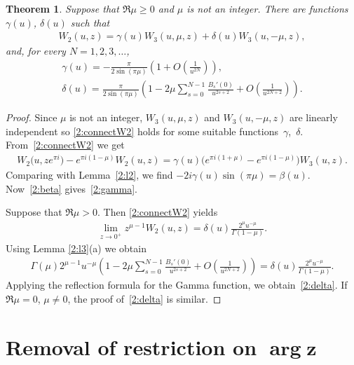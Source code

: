 \documentclass[pdftex]{sigma}
\numberwithin{equation}{section}
\newtheorem{Theorem}{Theorem}[section]
\begin{document}
\begin{Theorem}\label{2:t1}
Suppose that $\Re\mu\ge 0$ and $\mu$ is not an integer.
There are functions $\gamma(u)$, $\delta(u)$ such that
\begin{gather}\label{2:connectW2}
W_2(u,z)=\gamma(u)W_3(u,\mu,z)+\delta(u)W_3(u,-\mu,z) ,
\end{gather}
and, for every $N=1,2,3,\dots$,
\begin{gather}
 \gamma(u) = -\frac{\pi}{2\sin(\pi\mu)}\left(1+O\left(\frac{1}{u^{2N}}\right)\right),\label{2:gamma}\\
 \delta(u) = \frac{\pi}{2\sin(\pi\mu)}\left(1-2\mu\sum_{s=0}^{N-1}\frac{B_s'(0)}{u^{2s+2}}+O\left(\frac{1}{u^{2N+2}}\right)\right).\label{2:delta}
\end{gather}
\end{Theorem}
\begin{proof}
Since $\mu$ is not an integer, $W_3(u,\mu,z)$ and $W_3(u,-\mu,z)$ are linearly independent so \eqref{2:connectW2} holds for
some suitable functions~$\gamma$,~$\delta$.
From~\eqref{2:connectW2} we get
\begin{gather*}
W_2\big(u,ze^{\pi i}\big)-e^{\pi i (1-\mu)}W_2(u,z)=\gamma(u)\big(e^{\pi i(1+\mu)}-e^{\pi i(1-\mu)}\big) W_3(u,z) .
\end{gather*}
Comparing with Lemma~\ref{2:l2}, we f\/ind
$-2i\gamma(u)\sin(\pi\mu) =\beta(u)$.
Now~\eqref{2:beta} gives~\eqref{2:gamma}.

Suppose that $\Re\mu>0$. Then \eqref{2:connectW2} yields
\begin{gather*}
\lim_{z\to0^+} z^{\mu-1}W_2(u,z)=\delta(u)\frac{2^\mu u^{-\mu}}{\Gamma(1-\mu)}.
\end{gather*}
Using Lemma \ref{2:l3}(a) we obtain
\begin{gather*}
\Gamma(\mu)2^{\mu-1}u^{-\mu}\left(1-2\mu\sum_{s=0}^{N-1} \frac{B_s'(0)}{u^{2s+2}}+O\left(\frac{1}{u^{2N+2}}\right)\right)=\delta(u)\frac{2^\mu u^{-\mu}}{\Gamma(1-\mu)}.
\end{gather*}
Applying the ref\/lection formula for the Gamma function, we obtain~\eqref{2:delta}.
If $\Re\mu=0$, $\mu\neq0$, the proof of~\eqref{2:delta} is similar.
\end{proof}

\section[Removal of restriction on $\arg z$]{Removal of restriction on $\boldsymbol{\arg z}$}\label{removal}
\end{document}
